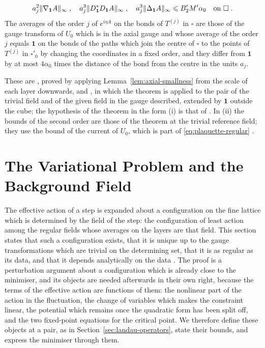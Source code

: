 \documentclass[11pt]{preprint}
\newcommand{\id}{\mathbf 1}
\DeclarePairedDelimiter{\norm}{\lVert}{\rVert}
\numberwithin{equation}{section}
\begin{document}
\begin{proposition}
\begin{enumerate}[label=(\roman*)]
\begin{equation}
    a_j^2\norm{\nabla_{\id}A}_\infty\;,\quad
    a_j^3\norm{D^*_{\id}D_{\id}A}_\infty\;,\quad
    a_j^3\norm{\Delta_{\id}A}_\infty \leqslant B'_2M'\alpha_0
    \quad\text{on } \square\;.
\end{equation}
The averages of the order $j$ of $e^{i\eta A}$ on the bonds of $T^{(j)}$ in $\square$ are those of the gauge transform of $U_0$ which is in the axial gauge and whose average of the order $j$ equals $\id$ on the bonds of the paths which join the centre of $\square$ to the points of $T^{(j)}$ in $\square'_0$ by changing the coordinates in a fixed order, and they differ from $\id$ by at most $4\alpha_0$ times the distance of the bond from the centre in the units $a_j$.
\end{enumerate}
\end{proposition}

These are \cite[(1.65), p.~87]{BalabanREG}, proved by applying Lemma~\ref{lem:axial-smallness} from the scale of each layer downwards, and \cite[Proposition~6, p.~99]{BalabanREG}, in which the theorem is applied to the pair of the trivial field and of the given field in the gauge described, extended by $\id$ outside the cube; the hypothesis of the theorem in the form (i) is that of \cite[Theorem~4, p.~88]{BalabanREG}. In (ii) the bounds of the second order are those of the theorem at the trivial reference field; they use the bound of the current of $U_0$, which is part of \eqref{eq:plaquette-regular} \cite[(1.9), p.~77]{BalabanREG}.

\section{The Variational Problem and the Background Field}\label{sec:variational}

The effective action of a step is expanded about a configuration on the fine lattice which is determined by the field of the step: the configuration of least action among the regular fields whose averages on the layers are that field. This section states that such a configuration exists, that it is unique up to the gauge transformations which are trivial on the determining set, that it is as regular as its data, and that it depends analytically on the data \cite{BalabanVAR}. The proof is a perturbation argument about a configuration which is already close to the minimiser, and its objects are needed afterwards in their own right, because the terms of the effective action are functions of them: the nonlinear part of the action in the fluctuation, the change of variables which makes the constraint linear, the potential which remains once the quadratic form has been split off, and the two fixed-point equations for the critical point. We therefore define these objects at a pair, as in Section~\ref{sec:landau-operators}, state their bounds, and express the minimiser through them.
\end{document}
